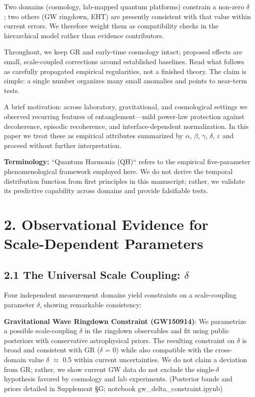 \documentclass[aps,prd,preprint,onecolumn,nofootinbib,superscriptaddress,longbibliography]{revtex4-2}
\begin{document}
Two domains (cosmology, lab-mapped quantum platforms) constrain a non-zero $\delta$; two others (GW ringdown, EHT) are presently consistent with that value within current errors. We therefore weight them as compatibility checks in the hierarchical model rather than evidence contributors.

Throughout, we keep GR and early-time cosmology intact; proposed effects are small, scale-coupled corrections around established baselines. Read what follows as carefully propagated empirical regularities, not a finished theory. The claim is simple: a single number organizes many small anomalies and points to near-term tests.

A brief motivation: across laboratory, gravitational, and cosmological settings we observed recurring features of entanglement---mild power-law protection against decoherence, episodic recoherence, and interface-dependent normalization. In this paper we treat these as empirical attributes summarized by {$\alpha$, $\beta$, $\gamma$, $\delta$, $\varepsilon$} and proceed without further interpretation.

\textbf{Terminology:} ``Quantum Harmonia (QH)`` refers to the empirical five-parameter phenomenological framework employed here. We do not derive the temporal distribution function from first principles in this manuscript; rather, we validate its predictive capability across domains and provide falsifiable tests.

\section{2. Observational Evidence for Scale-Dependent Parameters}

\subsection{2.1 The Universal Scale Coupling: $\delta$}

Four independent measurement domains yield constraints on a scale-coupling parameter $\delta$, showing remarkable consistency:

\textbf{Gravitational Wave Ringdown Constraint (GW150914)}:
We parametrize a possible scale-coupling $\delta$ in the ringdown observables and fit using public posteriors with conservative astrophysical priors. The resulting constraint on $\delta$ is broad and consistent with GR ($\delta$ = 0) while also compatible with the cross-domain value $\delta$ $\approx$ 0.5 within current uncertainties. We do not claim a deviation from GR; rather, we show current GW data do not exclude the single-$\delta$ hypothesis favored by cosmology and lab experiments.
(Posterior bands and priors detailed in Supplement §G; notebook gw\_delta\_constraint.ipynb)
\end{document}
